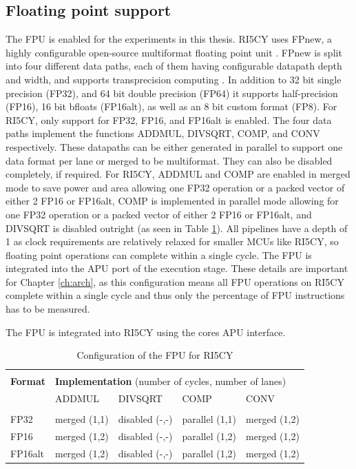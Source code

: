 \documentclass[../bachelor_paper.tex]{subfiles}
\begin{document}
\subsection{Floating point support}
    \label{sub:plat/ip/fpu}
The \ac{FPU} is enabled for the experiments in this thesis. RI5CY uses FPnew, a highly configurable open-source multiformat floating point unit \cite{machFPnewOpenSourceMultiformat2021}. FPnew is split into four different data paths, each of them having configurable datapath depth and width, and supports transprecision computing \cite{malossiTransprecisionComputingParadigm2018}. In addition to 32 bit single precision (FP32), and 64 bit double precision (FP64) it supports half-precision (FP16), 16 bit bfloats (FP16alt), as well as an 8 bit custom format (FP8). For RI5CY, only support for FP32, FP16, and FP16alt is enabled. The four data paths implement the functions \ac{ADDMUL}, \ac{DIVSQRT}, \ac{COMP}, and \ac{CONV} respectively. These datapaths can be either generated in parallel to support one data format per lane or merged to be multiformat. They can also be disabled completely, if required. For RI5CY, \ac{ADDMUL} and \ac{COMP} are enabled in merged mode to save power and area allowing one FP32 operation or a packed vector of either 2 FP16 or FP16alt, \ac{COMP} is implemented in parallel mode allowing for one FP32 operation or a packed vector of either 2 FP16 or FP16alt, and \ac{DIVSQRT} is disabled outright (as seen in Table \ref{tab:plat/base/fpu}). All pipelines have a depth of 1 as clock requirements are relatively relaxed for smaller \acp{MCU} like RI5CY, so floating point operations can complete within a single cycle. The \ac{FPU} is integrated into the \ac{APU} port of the execution stage. These details are important for Chapter \ref{ch:arch}, as this configuration means all FPU operations on RI5CY complete within a single cycle and thus only the percentage of FPU instructions has to be measured.

The \ac{FPU} is integrated into RI5CY using the cores \acl{APU} interface.

\begin{table}
    \centering
    \caption{Configuration of the FPU for RI5CY \cite{machFPnewOpenSourceMultiformat2021}}
    \begin{tabular}{lllll}
        \hline \\[-0.9em]
        \textbf{Format} & \multicolumn{4}{l}{\textbf{Implementation} (number of cycles, number of lanes)}   \\
                        & \ac{ADDMUL}   & \ac{DIVSQRT}  & \ac{COMP}     & \ac{CONV}     \\
        \hline \\[-0.9em]
        FP32            & merged (1,1)  & disabled (-,-)& parallel (1,1)& merged (1,2)  \\
        FP16            & merged (1,2)  & disabled (-,-)& parallel (1,2)& merged (1,2)  \\
        FP16alt         & merged (1,2)  & disabled (-,-)& parallel (1,2)& merged (1,2)  \\
        \hline
    \end{tabular}
    \label{tab:plat/base/fpu}
\end{table}
\end{document}
